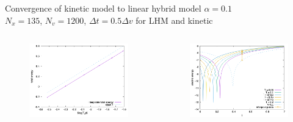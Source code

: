 \documentclass{beamer}
\begin{document}
\begin{frame}{Convergence of kinetic model to linear hybrid model}
  $\alpha = 0.1$ \\
  $N_x = 135$, $N_v = 1200$, $\Delta t = 0.5\Delta v$ for LHM and kinetic
  \begin{columns}
    \begin{column}{0.5\textwidth}
      \begin{figure}\centering
        \includegraphics[width=\textwidth]{img/limit_slope_totalenergy.png}
      \end{figure}
    \end{column}
    \begin{column}{0.5\textwidth}
      \begin{figure}\centering
        \includegraphics[width=\textwidth]{img/limit_ee.png}
      \end{figure}
    \end{column}
  \end{columns}
\end{frame}
\end{document}
